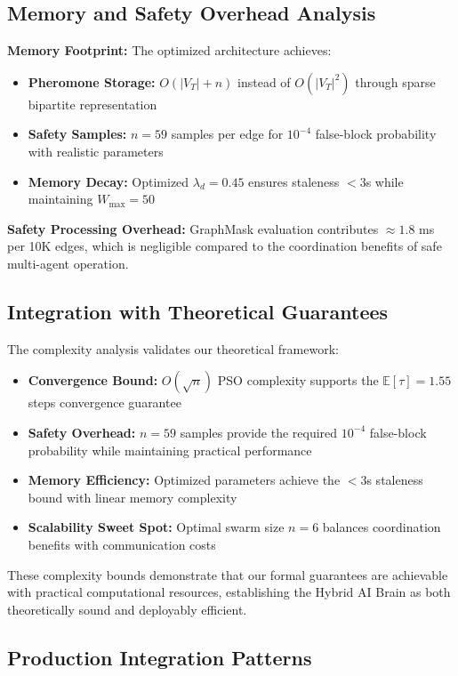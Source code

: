 \documentclass{article}
\begin{document}
\subsection{Memory and Safety Overhead Analysis}

\textbf{Memory Footprint:} The optimized architecture achieves:
\begin{itemize}
\item \textbf{Pheromone Storage:} $O(|V_T| + n)$ instead of $O(|V_T|^2)$ through sparse bipartite representation
\item \textbf{Safety Samples:} $n = 59$ samples per edge for $10^{-4}$ false-block probability with realistic parameters
\item \textbf{Memory Decay:} Optimized $\lambda_d = 0.45$ ensures staleness $< 3$s while maintaining $W_{\max} = 50$
\end{itemize}

\textbf{Safety Processing Overhead:} GraphMask evaluation contributes $\approx 1.8$ ms per 10K edges, which is negligible compared to the coordination benefits of safe multi-agent operation.

\subsection{Integration with Theoretical Guarantees}

The complexity analysis validates our theoretical framework:
\begin{itemize}
\item \textbf{Convergence Bound:} $O(\sqrt{n})$ PSO complexity supports the $\mathbb{E}[\tau] = 1.55$ steps convergence guarantee
\item \textbf{Safety Overhead:} $n = 59$ samples provide the required $10^{-4}$ false-block probability while maintaining practical performance
\item \textbf{Memory Efficiency:} Optimized parameters achieve the $< 3$s staleness bound with linear memory complexity
\item \textbf{Scalability Sweet Spot:} Optimal swarm size $n = 6$ balances coordination benefits with communication costs
\end{itemize}

These complexity bounds demonstrate that our formal guarantees are achievable with practical computational resources, establishing the Hybrid AI Brain as both theoretically sound and deployably efficient.

\subsection{Production Integration Patterns}
\end{document}

